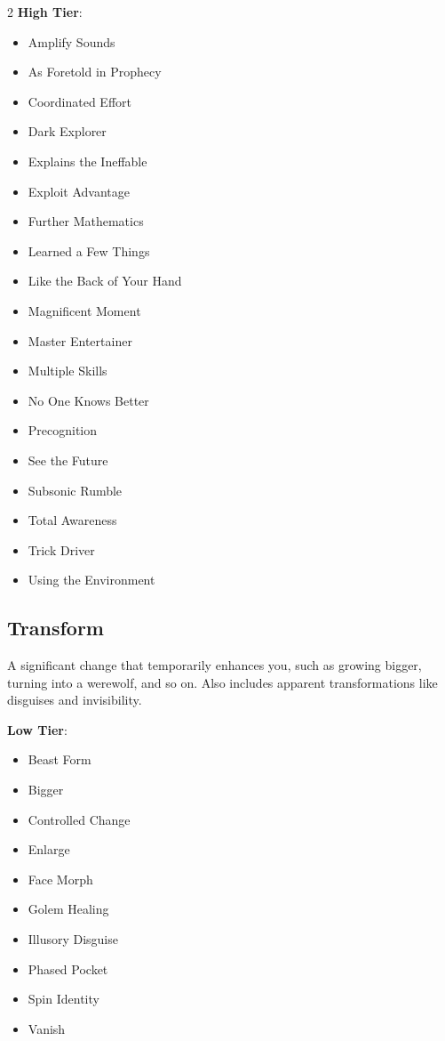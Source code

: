 \begin{multicols}{2}
\textbf{High Tier}:

\begin{itemize}
\item Amplify Sounds
\item As Foretold in Prophecy
\item Coordinated Effort
\item Dark Explorer
\item Explains the Ineffable
\item Exploit Advantage
\item Further Mathematics
\item Learned a Few Things
\item Like the Back of Your Hand
\item Magnificent Moment
\item Master Entertainer
\item Multiple Skills
\item No One Knows Better
\item Precognition
\item See the Future
\item Subsonic Rumble
\item Total Awareness
\item Trick Driver
\item Using the Environment
\end{itemize}

\subsection{Transform}

A significant change that temporarily enhances you, such as growing bigger, turning into a werewolf, and so on. Also includes apparent transformations like disguises and invisibility.

\textbf{Low Tier}:

\begin{itemize}
\item Beast Form
\item Bigger
\item Controlled Change
\item Enlarge
\item Face Morph
\item Golem Healing
\item Illusory Disguise
\item Phased Pocket
\item Spin Identity
\item Vanish
\end{itemize}


\end{multicols}
